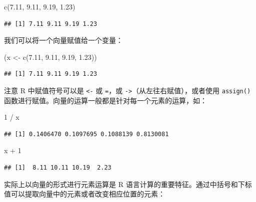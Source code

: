 \documentclass[
  b5paper,
  UTF8,twoside]{book}
\newenvironment{Shaded}{\begin{snugshade}}{\end{snugshade}}
\newcommand{\DecValTok}[1]{\textcolor[rgb]{0.00,0.00,0.81}{#1}}
\newcommand{\FloatTok}[1]{\textcolor[rgb]{0.00,0.00,0.81}{#1}}
\newcommand{\FunctionTok}[1]{\textcolor[rgb]{0.00,0.00,0.00}{#1}}
\newcommand{\NormalTok}[1]{#1}
\newcommand{\OtherTok}[1]{\textcolor[rgb]{0.56,0.35,0.01}{#1}}
\newcommand{\SpecialCharTok}[1]{\textcolor[rgb]{0.00,0.00,0.00}{#1}}
\begin{document}
\begin{Shaded}
\begin{Highlighting}[]
\FunctionTok{c}\NormalTok{(}\FloatTok{7.11}\NormalTok{, }\FloatTok{9.11}\NormalTok{, }\FloatTok{9.19}\NormalTok{, }\FloatTok{1.23}\NormalTok{)}
\end{Highlighting}
\end{Shaded}

\begin{verbatim}
## [1] 7.11 9.11 9.19 1.23
\end{verbatim}

我们可以将一个向量赋值给一个变量：

\begin{Shaded}
\begin{Highlighting}[]
\NormalTok{(x }\OtherTok{\textless{}{-}} \FunctionTok{c}\NormalTok{(}\FloatTok{7.11}\NormalTok{, }\FloatTok{9.11}\NormalTok{, }\FloatTok{9.19}\NormalTok{, }\FloatTok{1.23}\NormalTok{))}
\end{Highlighting}
\end{Shaded}

\begin{verbatim}
## [1] 7.11 9.11 9.19 1.23
\end{verbatim}

注意 R 中赋值符号可以是 \texttt{\textless{}-} 或 \texttt{=}，或 \texttt{-\textgreater{}}（从左往右赋值），或者使用 \texttt{assign()} 函数进行赋值。向量的运算一般都是针对每一个元素的运算，如：

\begin{Shaded}
\begin{Highlighting}[]
\DecValTok{1} \SpecialCharTok{/}\NormalTok{ x}
\end{Highlighting}
\end{Shaded}

\begin{verbatim}
## [1] 0.1406470 0.1097695 0.1088139 0.8130081
\end{verbatim}

\begin{Shaded}
\begin{Highlighting}[]
\NormalTok{x }\SpecialCharTok{+} \DecValTok{1}
\end{Highlighting}
\end{Shaded}

\begin{verbatim}
## [1]  8.11 10.11 10.19  2.23
\end{verbatim}

实际上以向量的形式进行元素运算是 R 语言计算的重要特征。通过中括号和下标值可以提取向量中的元素或者改变相应位置的元素：
\end{document}
